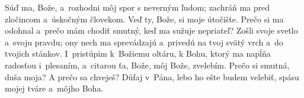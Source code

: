 Súď ma, Bože, a~rozhodni môj spor s neverným ľudom;
zachráň ma pred zločincom a~úskočným človekom.
\versseparator
Veď ty, Bože, si moje útočište.
Prečo si ma odohnal
a~prečo mám chodiť smutný, keď ma sužuje nepriateľ?
\versseparator
Zošli svoje svetlo a~svoju pravdu;
ony nech ma sprevádzajú a~privedú
na tvoj svätý vrch a~do tvojich stánkov.
\versseparator
 I~pristúpim k~Božiemu oltáru,
k Bohu, ktorý ma napĺňa radosťou i~plesaním,
\versseparator
a~citarou ťa, Bože, môj Bože, zvelebím.
Prečo si smutná, duša moja? A prečo sa chveješ?
\versseparator
Dúfaj v~Pána, lebo ho ešte budem velebiť,
spásu mojej tváre a~môjho Boha.